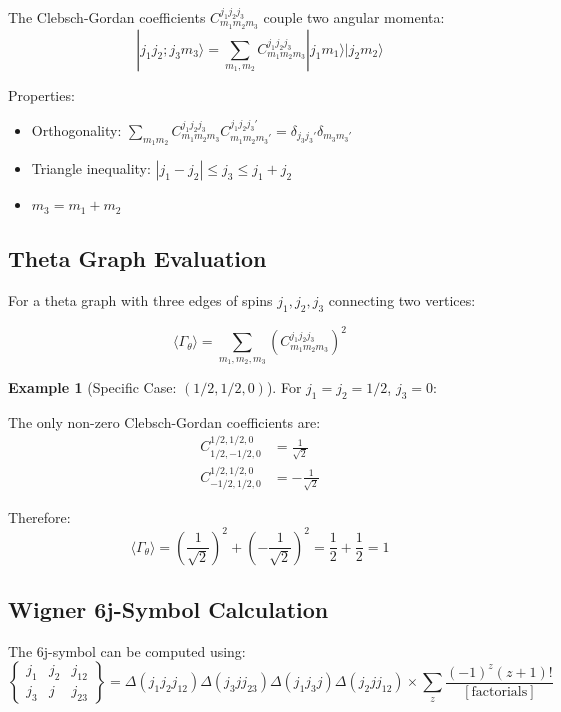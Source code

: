 \documentclass[12pt,a4paper]{article}
\theoremstyle{definition}
\newtheorem{example}{Example}[section]
\begin{document}
The Clebsch-Gordan coefficients $C^{j_1 j_2 j_3}_{m_1 m_2 m_3}$ couple two angular momenta:
\begin{equation}
|j_1 j_2; j_3 m_3\rangle = \sum_{m_1, m_2} C^{j_1 j_2 j_3}_{m_1 m_2 m_3} |j_1 m_1\rangle |j_2 m_2\rangle
\end{equation}

Properties:
\begin{itemize}
    \item Orthogonality: $\sum_{m_1 m_2} C^{j_1 j_2 j_3}_{m_1 m_2 m_3} C^{j_1 j_2 j_3'}_{m_1 m_2 m_3'} = \delta_{j_3 j_3'}\delta_{m_3 m_3'}$
    \item Triangle inequality: $|j_1 - j_2| \leq j_3 \leq j_1 + j_2$
    \item $m_3 = m_1 + m_2$
\end{itemize}

\subsection{Theta Graph Evaluation}

For a theta graph with three edges of spins $j_1, j_2, j_3$ connecting two vertices:

\begin{equation}
\langle\Gamma_\theta\rangle = \sum_{m_1,m_2,m_3} \left(C^{j_1 j_2 j_3}_{m_1 m_2 m_3}\right)^2
\end{equation}

\begin{example}[Specific Case: $(1/2, 1/2, 0)$]
For $j_1 = j_2 = 1/2$, $j_3 = 0$:

The only non-zero Clebsch-Gordan coefficients are:
\begin{align}
C^{1/2, 1/2, 0}_{1/2, -1/2, 0} &= \frac{1}{\sqrt{2}} \\
C^{1/2, 1/2, 0}_{-1/2, 1/2, 0} &= -\frac{1}{\sqrt{2}}
\end{align}

Therefore:
\begin{equation}
\langle\Gamma_\theta\rangle = \left(\frac{1}{\sqrt{2}}\right)^2 + \left(-\frac{1}{\sqrt{2}}\right)^2 = \frac{1}{2} + \frac{1}{2} = 1
\end{equation}
\end{example}

\subsection{Wigner 6j-Symbol Calculation}

The 6j-symbol can be computed using:
\begin{equation}
\begin{Bmatrix} j_1 & j_2 & j_{12} \\ j_3 & j & j_{23} \end{Bmatrix} = 
\Delta(j_1 j_2 j_{12}) \Delta(j_3 j j_{23}) \Delta(j_1 j_3 j) \Delta(j_2 j j_{12})
\times \sum_z \frac{(-1)^z (z+1)!}{[\text{factorials}]}
\end{equation}
\end{document}
